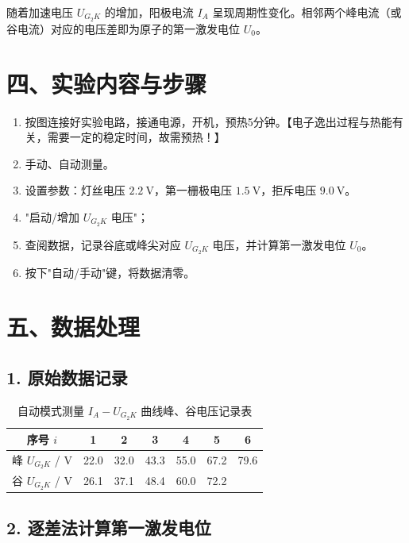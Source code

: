 \documentclass[UTF8,a4paper,zihao=-4]{ctexart}
\begin{document}
随着加速电压 \(U_{G_2K}\) 的增加，阳极电流 \(I_A\) 呈现周期性变化。相邻两个峰电流（或谷电流）对应的电压差即为原子的第一激发电位 \(U_0\)。

\section*{四、实验内容与步骤}

\begin{enumerate}[label=\arabic*.]
    \item 按图连接好实验电路，接通电源，开机，预热5分钟。【电子逸出过程与热能有关，需要一定的稳定时间，故需预热！】
    \item 手动、自动测量。
    \item 设置参数：灯丝电压 \(2.2\ \text{V}\)，第一栅极电压 \(1.5\ \text{V}\)，拒斥电压 \(9.0\ \text{V}\)。
    \item "启动/增加 \(U_{G_2K}\) 电压"；
    \item 查阅数据，记录谷底或峰尖对应 \(U_{G_2K}\) 电压，并计算第一激发电位 \(U_0\)。
    \item 按下"自动/手动"键，将数据清零。
\end{enumerate}

\section*{五、数据处理}

\subsection*{1. 原始数据记录}

\begin{table}[H]
    \centering
    \caption{自动模式测量 \(I_A-U_{G_2K}\) 曲线峰、谷电压记录表}
    \renewcommand{\arraystretch}{1.35}
    \begin{tabular}{ccccccc}
        \toprule
        序号 \(i\) & 1 & 2 & 3 & 4 & 5 & 6 \\
        \midrule
        峰 \(U_{G_2K}\) / V & 22.0 & 32.0 & 43.3 & 55.0 & 67.2 & 79.6 \\
        谷 \(U_{G_2K}\) / V & 26.1 & 37.1 & 48.4 & 60.0 & 72.2 & \\
        \bottomrule
    \end{tabular}
\end{table}

\subsection*{2. 逐差法计算第一激发电位}
\end{document}
